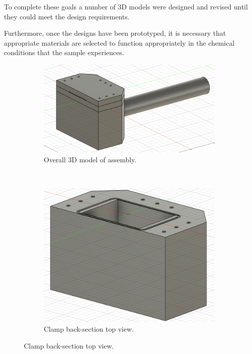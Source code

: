To complete these goals a number of 3D models were designed and revised until they could meet the design requirements.

Furthermore, once the designs have been prototyped, it is necessary that appropriate materials are selected to function appropriately in the chemical conditions that the sample experiences.


\begin{figure}
    \centering
    \begin{subfigure}[t]{0.8\textwidth}
        \includegraphics[width=\textwidth]{Main/Ch4/3D_models/clamp-overall.png}
        \caption{Overall 3D model of assembly.}
    \end{subfigure}
    ~
    \begin{subfigure}[t]{0.3\textwidth}
        \includegraphics[width=\textwidth]{Main/Ch4/3D_models/clamp-bottom-top.png}
        \caption{Clamp back-section top view.}

\end{subfigure}
\end{figure}
